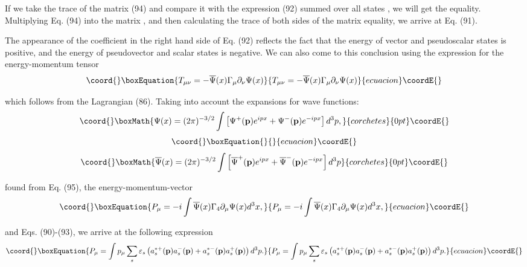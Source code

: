 \documentclass[a4paper,12pt]{article}
\begin{document}
If we take the trace of the matrix (94) and compare it with the expression
(92) summed over all states \coordHE{}, we will get the equality. Multiplying Eq.
(94) into the matrix \coordHE{}, and then calculating the trace of both
sides of the matrix equality, we arrive at Eq. (91).

The appearance of the coefficient \coordHE{} in the right hand
side of Eq. (92) reflects the fact that the energy of vector and
pseudoscalar states is positive, and the energy of pseudovector and scalar
states is negative. We can also come to this conclusion using the expression
for the energy-momentum tensor
\begin{equation}\coord{}\boxEquation{
T_{\mu \nu }=-\overline{\Psi }(x)\Gamma _\mu \partial _\nu \Psi (x)
\label{95}
}{
T_{\mu \nu }=-\overline{\Psi }(x)\Gamma _\mu \partial _\nu \Psi (x)
}{ecuacion}\coordE{}\end{equation}

which follows from the Lagrangian (86). Taking into account the expansions
for wave functions:
\[\coord{}\boxMath{
\Psi (x)=(2\pi )^{-3/2}\int \left[ \Psi
^{+}(\mathbf{p})e^{ipx}+\Psi ^{-}( \mathbf{p})e^{-ipx}\right] d^3p
,
}{corchetes}{0pt}\coordE{}\]
\vspace{-8mm}
\begin{equation}\coord{}\boxEquation{
\label{96}
}{
}{ecuacion}\coordE{}\end{equation}
\vspace{-8mm}
\[\coord{}\boxMath{
\overline{\Psi }(x)=(2\pi )^{-3/2}\int \left[ \overline{\Psi
}^{+}(\mathbf{p} )e^{ipx}+\overline{\Psi
}^{-}(\mathbf{p})e^{-ipx}\right] d^3p
}{corchetes}{0pt}\coordE{}\]

found from Eq. (95), the energy-momentum-vector
\begin{equation}\coord{}\boxEquation{
P_\mu =-i\int \overline{\Psi }(x)\Gamma _4\partial _\mu \Psi
(x)d^3x ,\label{97}
}{
P_\mu =-i\int \overline{\Psi }(x)\Gamma _4\partial _\mu \Psi
(x)d^3x ,}{ecuacion}\coordE{}\end{equation}

and Eqs. (90)-(93), we arrive at the following expression
\begin{equation}\coord{}\boxEquation{
P_\mu =\int p_\mu \sum_s\varepsilon _s\left(
a_s^{*+}(\mathbf{p})a_s^{-}(
\mathbf{p})+a_s^{*-}(\mathbf{p})a_s^{+}(\mathbf{p})\right) d^3p .
\label{98}
}{
P_\mu =\int p_\mu \sum_s\varepsilon _s\left(
a_s^{*+}(\mathbf{p})a_s^{-}(
\mathbf{p})+a_s^{*-}(\mathbf{p})a_s^{+}(\mathbf{p})\right) d^3p .
}{ecuacion}\coordE{}\end{equation}
\end{document}
